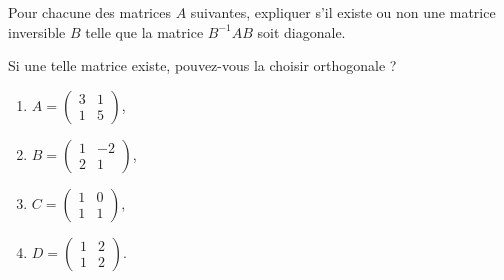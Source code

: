 

\begin{exercice}\label{exoINGE1121La0021}

	Pour chacune des matrices $A$ suivantes, expliquer s'il existe ou non une matrice inversible $B$ telle que la matrice $B^{-1}AB$ soit diagonale. 
	
	Si une telle matrice existe, pouvez-vous la choisir orthogonale ?
	\begin{enumerate}

		\item
			$A=\begin{pmatrix}
				3	&	1	\\ 
				1	&	5	
			\end{pmatrix}$,
		\item
			$B=\begin{pmatrix}
				1	&	-2	\\ 
				2	&	1	
			\end{pmatrix}$,
		\item
			$C=\begin{pmatrix}
				1	&	0	\\ 
				1	&	1	
			\end{pmatrix}$,
		\item
			$D=\begin{pmatrix}
				1	&	2	\\ 
				1	&	2	
			\end{pmatrix}$.

	\end{enumerate}

\end{exercice}
